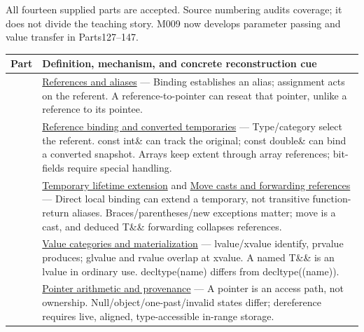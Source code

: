 \hypertarget{appendix-fd090d982a15-m008---parts-113-126}{}

All fourteen supplied parts are accepted. Source numbering audits coverage; it does not divide the teaching story. M009 now develops parameter passing and value transfer in Parts127--147.

{\def\LTcaptype{none} %
\begin{longtable}[]{@{}
  >{\raggedright\arraybackslash}p{}
  >{\raggedright\arraybackslash}p{}@{}}
\toprule\noalign{}
\begin{minipage}[b]{\linewidth}\raggedright
Part
\end{minipage} & \begin{minipage}[b]{\linewidth}\raggedright
Definition, mechanism, and concrete reconstruction cue
\end{minipage} \\
\midrule\noalign{}
\endhead
\bottomrule\noalign{}
\endlastfoot
113 & \hyperref[appendix-d6d562ca9fbb]{References and aliases} --- Binding establishes an alias; assignment acts on the referent. A reference-to-pointer can reseat that pointer, unlike a reference to its pointee. \\
114 & \hyperref[appendix-37856d997bb0]{Reference binding and converted temporaries} --- Type/category select the referent. const int\& can track the original; const double\& can bind a converted snapshot. Arrays keep extent through array references; bit-fields require special handling. \\
115 & \hyperref[appendix-a978b29bbbb0]{Temporary lifetime extension} and \hyperref[appendix-0104b704fb11]{Move casts and forwarding references} --- Direct local binding can extend a temporary, not transitive function-return aliases. Braces/parentheses/new exceptions matter; move is a cast, and deduced T\&\& forwarding collapses references. \\
116 & \hyperref[appendix-1121b30eaeb0]{Value categories and materialization} --- lvalue/xvalue identify, prvalue produces; glvalue and rvalue overlap at xvalue. A named T\&\& is an lvalue in ordinary use. decltype(name) differs from decltype((name)). \\
117 & \hyperref[appendix-6af5921bc853]{Pointer arithmetic and provenance} --- A pointer is an access path, not ownership. Null/object/one-past/invalid states differ; dereference requires live, aligned, type-accessible in-range storage. \\

\end{longtable}}
